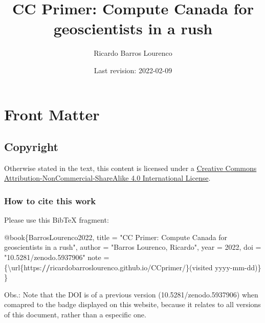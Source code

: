 \documentclass[
]{book}
\title{CC Primer: Compute Canada for geoscientists in a rush}
\author{Ricardo Barros Lourenco}
\date{Last revision: 2022-02-09}
\newenvironment{Shaded}{\begin{snugshade}}{\end{snugshade}}
\newcommand{\DecValTok}[1]{\textcolor[rgb]{0.00,0.00,0.81}{#1}}
\newcommand{\ErrorTok}[1]{\textcolor[rgb]{0.64,0.00,0.00}{\textbf{#1}}}
\newcommand{\NormalTok}[1]{#1}
\newcommand{\OtherTok}[1]{\textcolor[rgb]{0.56,0.35,0.01}{#1}}
\newcommand{\SpecialCharTok}[1]{\textcolor[rgb]{0.00,0.00,0.00}{#1}}
\newcommand{\StringTok}[1]{\textcolor[rgb]{0.31,0.60,0.02}{#1}}
\begin{document}
\maketitle

{
\setcounter{tocdepth}{1}
\tableofcontents
}
\hypertarget{front-matter}{%
\chapter{Front Matter}\label{front-matter}}

\hypertarget{copyright}{%
\section{Copyright}\label{copyright}}

Otherwise stated in the text, this content is licensed under a \href{http://creativecommons.org/licenses/by-nc-sa/4.0/}{Creative Commons Attribution-NonCommercial-ShareAlike 4.0 International License}.

\hypertarget{how-to-cite-this-work}{%
\subsection{How to cite this work}\label{how-to-cite-this-work}}

Please use this BibTeX fragment:

\begin{Shaded}
\begin{Highlighting}[]
\SpecialCharTok{@}\NormalTok{book\{BarrosLourenco2022,}
\NormalTok{  title     }\OtherTok{=} \StringTok{"CC Primer: Compute Canada for geoscientists in a rush"}\NormalTok{,}
\NormalTok{  author    }\OtherTok{=} \StringTok{"Barros Lourenco, Ricardo"}\NormalTok{,}
\NormalTok{  year      }\OtherTok{=} \DecValTok{2022}\NormalTok{,}
\NormalTok{  doi       }\OtherTok{=} \StringTok{"10.5281/zenodo.5937906"}
\NormalTok{  note      }\OtherTok{=}\NormalTok{ \{\textbackslash{}url\{https}\SpecialCharTok{:}\ErrorTok{//}\NormalTok{ricardobarroslourenco.github.io}\SpecialCharTok{/}\NormalTok{CCprimer}\SpecialCharTok{/}\NormalTok{\}(visited yyyy}\SpecialCharTok{{-}}\NormalTok{mm}\SpecialCharTok{{-}}\NormalTok{dd)\}}
\NormalTok{\}}
\end{Highlighting}
\end{Shaded}

Obs.: Note that the DOI is of a previous version (10.5281/zenodo.5937906) when
comapred to the badge displayed on this website, because it relates to all versions
of this document, rather than a especific one.
\end{document}
